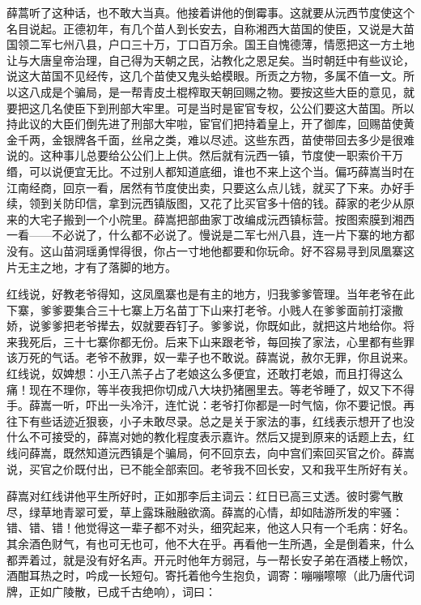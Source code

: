 薛蒿听了这种话，也不敢大当真。他接着讲他的倒霉事。这就要从沅西节度使这个名目说起。正德初年，有几个苗人到长安去，自称湘西大苗国的使臣，又说是大苗国领二军七州八县，户口三十万，丁口百万余。国王自愧德薄，情愿把这一方土地让与大唐皇帝治理，自己得为天朝之民，沾教化之恩足矣。当时朝廷中有些议论，说这大苗国不见经传，这几个苗使又鬼头蛤模眼。所贡之方物，多属不值一文。所以这八成是个骗局，是一帮青皮土棍榨取天朝回赐之物。要按这些大臣的意见，就要把这几名使臣下到刑部大牢里。可是当时是宦官专权，公公们要这大苗国。所以持此议的大臣们倒先进了刑部大牢啦，宦官们把持着皇上，开了御库，回赐苗使黄金千两，金银牌各千面，丝帛之类，难以尽述。这些东西，苗使带回去多少是很难说的。这种事儿总要给公公们上上供。然后就有沅西一镇，节度使一职索价干万缗，可以说便宜无比。不过别人都知道底细，谁也不来上这个当。偏巧薛嵩当时在江南经商，回京一看，居然有节度使出卖，只要这么点儿钱，就买了下来。办好手续，领到关防印信，拿到沅西镇版图，又花了比买官多十倍的钱。薛家的老少从原来的大宅子搬到一个小院里。薛嵩把部曲家丁改编成沅西镇标营。按图索膜到湘西一看——不必说了，什么都不必说了。慢说是二军七州八县，连一片下寨的地方都没有。这山苗洞瑶勇悍得很，你占一寸地他都要和你玩命。好不容易寻到凤凰寨这片无主之地，才有了落脚的地方。 

红线说，好教老爷得知，这凤凰寨也是有主的地方，归我爹爹管理。当年老爷在此下寨，爹爹要集合三十七寨上万名苗丁下山来打老爷。小贱人在爹爹面前打滚撒娇，说爹爹把老爷撵去，奴就要吞钉子。爹爹说，你既如此，就把这片地给你。将来我死后，三十七寨你都无份。后来下山来跟老爷，每回挨了家法，心里都有些罪该万死的气话。老爷不赦罪，奴一辈子也不敢说。薛嵩说，赦尔无罪，你且说来。红线说，奴婢想：小王八羔子占了老娘这么多便宜，还敢打老娘，而且打得这么痛！现在不理你，等半夜我把你切成八大块扔猪圈里去。等老爷睡了，奴又下不得手。薛嵩一听，吓出一头冷汗，连忙说：老爷打你都是一时气恼，你不要记恨。再往下有些话迹近狠亵，小子未敢尽录。总之是关于家法的事，红线表示想开了也没什么不可接受的，薛嵩对她的教化程度表示嘉许。然后又提到原来的话题上去，红线问薛嵩，既然知道沅西镇是个骗局，何不回京去，向中宫们索回买官之价。薛嵩说，买官之价既付出，已不能全部索回。老爷我不回长安，又和我平生所好有关。 

薛嵩对红线讲他平生所好时，正如那李后主词云：红日已高三丈透。彼时雾气散尽，绿草地青翠可爱，草上露珠融融欲滴。薛嵩的心情，却如陆游所发的牢骚：错、错、错！他觉得这一辈子都不对头，细究起来，他这人只有一个毛病：好名。其余酒色财气，有也可无也可，他不大在乎。再看他一生所遇，全是倒着来，什么都弄着过，就是没有好名声。开元时他年方弱冠，与一帮长安子弟在酒楼上畅饮，酒酣耳热之时，吟成一长短句。寄托着他今生抱负，调寄：嘣嘣嚓嚓（此乃唐代词牌，正如广陵散，已成千古绝响），词曰： 

